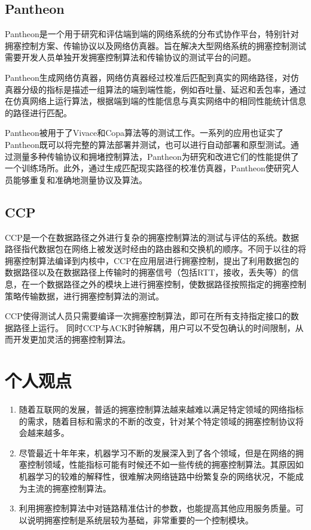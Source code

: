 \documentclass[a4paper, 12pt, UTF8]{ctexart}
\begin{document}
\subsection{Pantheon}
\par Pantheon是一个用于研究和评估端到端的网络系统的分布式协作平台，特别针对拥塞控制方案、传输协议以及网络仿真器。旨在解决大型网络系统的拥塞控制测试需要开发人员单独开发拥塞控制算法和传输协议的测试平台的问题。
\par Pantheon生成网络仿真器，网络仿真器经过校准后匹配到真实的网络路径，对仿真器分级的指标是描述一组算法的端到端性能，例如吞吐量、延迟和丢包率，通过在仿真网络上运行算法，根据端到端的性能信息与真实网络中的相同性能统计信息的路径进行匹配。
\par Pantheon被用于了Vivace和Copa算法等的测试工作。一系列的应用也证实了Pantheon既可以将完整的算法部署并测试，也可以进行自动部署和原型测试。通过测量多种传输协议和拥堵控制算法，Pantheon为研究和改进它们的性能提供了一个训练场所。此外，通过生成匹配现实路径的校准仿真器，Pantheon使研究人员能够重复和准确地测量协议及算法\cite{DBLP:conf/usenix/YanMHRWLW18}。

\subsection{CCP}
\par CCP是一个在数据路径之外进行复杂的拥塞控制算法的测试与评估的系统。数据路径指代数据包在网络上被发送时经由的路由器和交换机的顺序。不同于以往的将拥塞控制算法编译到内核中，CCP在应用层进行拥塞控制，提出了利用数据包的数据路径以及在数据路径上传输时的拥塞信号（包括RTT，接收，丢失等）的信息，在一个数据路径之外的模块上进行拥塞控制，使数据路径按照指定的拥塞控制策略传输数据，进行拥塞控制算法的测试。
\par CCP使得测试人员只需要编译一次拥塞控制算法，即可在所有支持指定接口的数据路径上运行。
同时CCP与ACK时钟解耦，用户可以不受包确认的时间限制，从而开发更加灵活的拥塞控制算法\cite{DBLP:conf/sigcomm/NarayanCRGNMAB18}。
\clearpage

\section{个人观点}
\begin{enumerate}
	\item 随着互联网的发展，普适的拥塞控制算法越来越难以满足特定领域的网络指标的需求，随着目标和需求的不断的改变，针对某个特定领域的拥塞控制协议将会越来越多。
	\item 尽管最近十年年来，机器学习不断的发展深入到了各个领域，但是在网络的拥塞控制领域，性能指标可能有时候还不如一些传统的拥塞控制算法。其原因如机器学习的较难的解释性，很难解决网络链路中纷繁复杂的网络状况，不能成为主流的拥塞控制算法。
	\item 利用拥塞控制算法中对链路精准估计的参数，也能提高其他应用服务质量。可以说明拥塞控制是系统层较为基础，非常重要的一个控制模块。
\end{enumerate}
\end{document}
